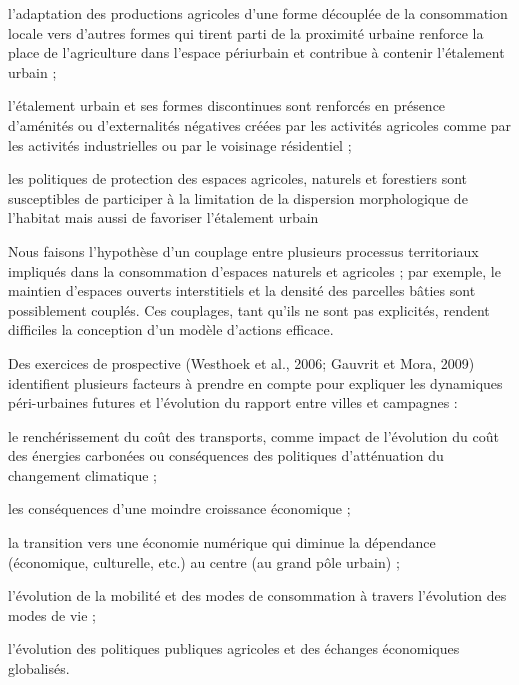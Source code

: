 	\item	l'adaptation des productions agricoles d'une forme
		découplée de la consommation locale vers d'autres
		formes qui tirent parti de la proximité urbaine
		renforce la place de l'agriculture dans l'espace périurbain
		et contribue à contenir l'étalement urbain ;

	\item	l'étalement urbain et ses formes discontinues sont renforcés
		en présence d'aménités ou d'externalités négatives créées par les activités
		agricoles comme par les activités industrielles
		ou par le voisinage résidentiel ;

	\item	les politiques de protection des espaces agricoles, naturels
		et forestiers sont susceptibles de participer
		à la limitation de la dispersion morphologique de l'habitat
		mais aussi de favoriser l'étalement urbain

	\stopitemize

\item	Nous faisons l'hypothèse d'un couplage entre plusieurs processus territoriaux
	impliqués dans la consommation d'espaces naturels et agricoles ;
	par exemple, le maintien d'espaces ouverts
	interstitiels et la densité des parcelles bâties sont possiblement couplés.
	Ces couplages, tant qu'ils ne sont pas explicités,
	rendent difficiles la conception d'un modèle d'actions efficace.

\stopitemize

Des exercices de prospective (Westhoek et al., 2006; Gauvrit et Mora, 2009)
identifient plusieurs facteurs à prendre en compte pour expliquer
les dynamiques péri-urbaines futures et l'évolution du rapport
entre villes et campagnes :

\startitemize

\item	le renchérissement du coût des transports,
	comme impact de l'évolution du coût des énergies carbonées
	ou conséquences des politiques d'atténuation du changement climatique ;

\item 	les conséquences d'une moindre croissance économique ;

\item 	la transition vers une économie numérique
	qui diminue la dépendance (économique, culturelle, etc.)
	au centre (au grand pôle urbain) ;

\item	l'évolution de la mobilité et des modes de consommation
	à travers l'évolution des modes de vie ;

\item	l'évolution des politiques publiques agricoles
	et des échanges économiques globalisés.

\stopitemize